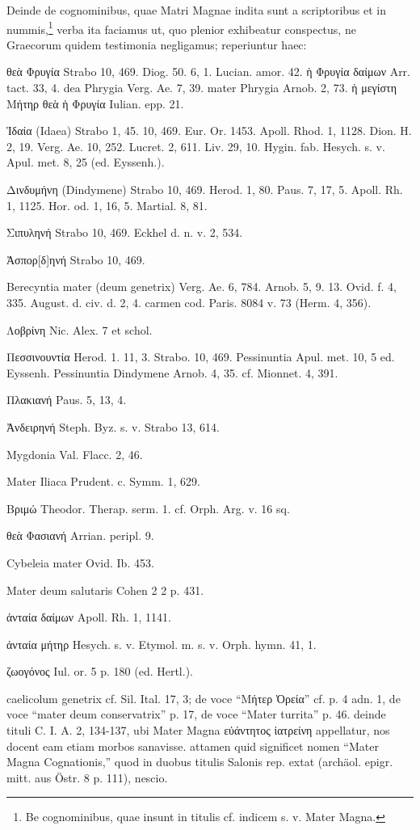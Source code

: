 \documentclass[a4paper, 11pt, oneside, polutonikogreek, german]{article}
\begin{document}
Deinde de cognominibus, quae Matri Magnae indita sunt a scriptoribus et in nummis,\footnote{Be cognominibus, quae insunt in titulis cf. indicem s. v. Mater Magna.} verba ita faciamus ut, quo plenior exhibeatur conspectus, ne Graecorum quidem testimonia negligamus; reperiuntur haec:

θεὰ Φρυγία Strabo 10, 469. Diog. 50. 6, 1. Lucian. amor. 42. ἡ Φρυγία δαίμων Arr. tact. 33, 4. dea Phrygia Verg. Ae. 7, 39. mater Phrygia Arnob. 2, 73. ἡ μεγίστη Μήτηρ θεὰ ἡ Φρυγία Iulian. epp. 21.

Ἰδαία (Idaea) Strabo 1, 45. 10, 469. Eur. Or. 1453. Apoll. Rhod. 1, 1128. Dion. H. 2, 19. Verg. Ae. 10, 252. Lucret. 2, 611. Liv. 29, 10. Hygin. fab. Hesych. s. v. Apul. met. 8, 25 (ed. Eyssenh.).

Δινδυμήνη (Dindymene) Strabo 10, 469. Herod. 1, 80. Paus. 7, 17, 5. Apoll. Rh. 1, 1125. Hor. od. 1, 16, 5. Martial. 8, 81.

Σιπυληνή Strabo 10, 469. Eckhel d. n. v. 2, 534.

Ἀσπορ[δ]ηνή Strabo 10, 469.

Berecyntia mater (deum genetrix) Verg. Ae. 6, 784. Arnob. 5, 9. 13. Ovid. f. 4, 335. August. d. civ. d. 2, 4. carmen cod. Paris. 8084 v. 73 (Herm. 4, 356).

Λοβρίνη Nic. Alex. 7 et schol.

Πεσσινουντία Herod. 1. 11, 3. Strabo. 10, 469. Pessinuntia Apul. met. 10, 5 ed. Eyssenh. Pessinuntia Dindymene Arnob. 4, 35. cf. Mionnet. 4, 391.

Πλακιανή Paus. 5, 13, 4.

Ἀνδειρηνή Steph. Byz. s. v. Strabo 13, 614.

Mygdonia Val. Flacc. 2, 46.

Mater Iliaca Prudent. c. Symm. 1, 629.

Βριμώ Theodor. Therap. serm. 1. cf. Orph. Arg. v. 16 sq.

θεὰ Φασιανή Arrian. peripl. 9.

Cybeleia mater Ovid. Ib. 453.

Mater deum salutaris Cohen 2 2 p. 431.

ἀνταία δαίμων Apoll. Rh. 1, 1141.

ἀνταία μήτηρ Hesych. s. v. Etymol. m. s. v. Orph. hymn. 41, 1.

ζωογόνος Iul. or. 5 p. 180 (ed. Hertl.).

caelicolum genetrix cf. Sil. Ital. 17, 3; de voce "`Μήτερ Ὀρεία"' cf. p. 4 adn. 1, de voce "`mater deum conservatrix"' p. 17, de voce "`Mater turrita"' p. 46. deinde tituli C. I. A. 2, 134-137, ubi Mater Magna εὐάντητος ἰατρείνη appellatur, nos docent eam etiam morbos sanavisse. attamen quid significet nomen "`Mater Magna Cognationis,"' quod in duobus titulis Salonis rep. extat (archäol. epigr. mitt. aus Östr. 8 p. 111), nescio.
\end{document}
